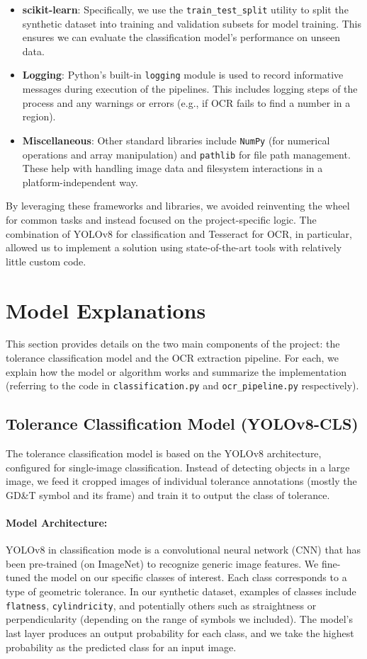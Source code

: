 \documentclass[11pt,a4paper]{article}
\begin{document}
\begin{itemize}
  \item \textbf{scikit-learn}: Specifically, we use the \verb|train_test_split| utility to split the synthetic dataset into training and validation subsets for model training. This ensures we can evaluate the classification model’s performance on unseen data.
  \item \textbf{Logging}: Python’s built-in \verb|logging| module is used to record informative messages during execution of the pipelines. This includes logging steps of the process and any warnings or errors (e.g., if OCR fails to find a number in a region).
  \item \textbf{Miscellaneous}: Other standard libraries include \verb|NumPy| (for numerical operations and array manipulation) and \verb|pathlib| for file path management. These help with handling image data and filesystem interactions in a platform-independent way.
\end{itemize}

By leveraging these frameworks and libraries, we avoided reinventing the wheel for common tasks and instead focused on the project-specific logic. The combination of YOLOv8 for classification and Tesseract for OCR, in particular, allowed us to implement a solution using state-of-the-art tools with relatively little custom code.

\section{Model Explanations}
This section provides details on the two main components of the project: the tolerance classification model and the OCR extraction pipeline. For each, we explain how the model or algorithm works and summarize the implementation (referring to the code in \verb|classification.py| and \verb|ocr_pipeline.py| respectively).

\subsection{Tolerance Classification Model (YOLOv8-CLS)}
The tolerance classification model is based on the YOLOv8 architecture, configured for single-image classification. Instead of detecting objects in a large image, we feed it cropped images of individual tolerance annotations (mostly the GD\&T symbol and its frame) and train it to output the class of tolerance.

\paragraph{Model Architecture:} YOLOv8 in classification mode is a convolutional neural network (CNN) that has been pre-trained (on ImageNet) to recognize generic image features. We fine-tuned the model on our specific classes of interest. Each class corresponds to a type of geometric tolerance. In our synthetic dataset, examples of classes include \texttt{flatness}, \texttt{cylindricity}, and potentially others such as straightness or perpendicularity (depending on the range of symbols we included). The model’s last layer produces an output probability for each class, and we take the highest probability as the predicted class for an input image.
\end{document}
